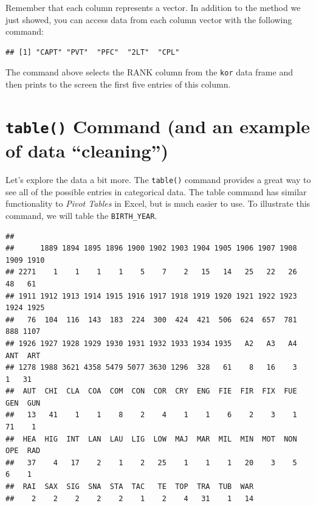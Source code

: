 \documentclass[]{book}
\newenvironment{Shaded}{\begin{snugshade}}{\end{snugshade}}
\newcommand{\KeywordTok}[1]{\textcolor[rgb]{0.13,0.29,0.53}{\textbf{{#1}}}}
\newcommand{\DecValTok}[1]{\textcolor[rgb]{0.00,0.00,0.81}{{#1}}}
\newcommand{\CommentTok}[1]{\textcolor[rgb]{0.56,0.35,0.01}{\textit{{#1}}}}
\newcommand{\NormalTok}[1]{{#1}}
\begin{document}
Remember that each column represents a vector. In addition to the method
we just showed, you can access data from each column vector with the
following command:

\begin{Shaded}
\end{Shaded}

\begin{verbatim}
## [1] "CAPT" "PVT"  "PFC"  "2LT"  "CPL"
\end{verbatim}

The command above selects the RANK column from the \texttt{kor} data
frame and then prints to the screen the first five entries of this
column.

\section{\texorpdfstring{\texttt{table()} Command (and an example of
data
``cleaning'')}{table() Command (and an example of data cleaning)}}\label{table-command-and-an-example-of-data-cleaning}

Let's explore the data a bit more. The \texttt{table()} command provides
a great way to see all of the possible entries in categorical data. The
table command has similar functionality to \emph{Pivot Tables} in Excel,
but is much easier to use. To illustrate this command, we will table the
\texttt{BIRTH\_YEAR}.

\begin{Shaded}
\end{Shaded}

\begin{verbatim}
## 
##      1889 1894 1895 1896 1900 1902 1903 1904 1905 1906 1907 1908 1909 1910 
## 2271    1    1    1    1    5    7    2   15   14   25   22   26   48   61 
## 1911 1912 1913 1914 1915 1916 1917 1918 1919 1920 1921 1922 1923 1924 1925 
##   76  104  116  143  183  224  300  424  421  506  624  657  781  888 1107 
## 1926 1927 1928 1929 1930 1931 1932 1933 1934 1935   A2   A3   A4  ANT  ART 
## 1278 1988 3621 4358 5479 5077 3630 1296  328   61    8   16    3    1   31 
##  AUT  CHI  CLA  COA  COM  CON  COR  CRY  ENG  FIE  FIR  FIX  FUE  GEN  GUN 
##   13   41    1    1    8    2    4    1    1    6    2    3    1   71    1 
##  HEA  HIG  INT  LAN  LAU  LIG  LOW  MAJ  MAR  MIL  MIN  MOT  NON  OPE  RAD 
##   37    4   17    2    1    2   25    1    1    1   20    3    5    6    1 
##  RAI  SAX  SIG  SNA  STA  TAC   TE  TOP  TRA  TUB  WAR 
##    2    2    2    2    2    1    2    4   31    1   14
\end{verbatim}
\end{document}
